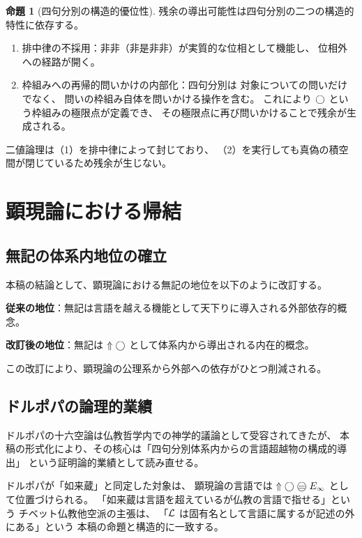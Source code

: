 \documentclass[11pt,a4paper]{article}
\theoremstyle{definition}
\newtheorem{proposition}{命題}[section]
\newcommand{\Einfty}{E_\infty}
\newcommand{\phiNS}{\text{非非}}
\begin{document}
\begin{proposition}[四句分別の構造的優位性]
残余の導出可能性は四句分別の二つの構造的特性に依存する。
\begin{enumerate}
  \item 排中律の不採用：$\phiNS$（非是非非）が実質的な位相として機能し、
        位相外への経路が開く。
  \item 枠組みへの再帰的問いかけの内部化：四句分別は
        対象についての問いだけでなく、
        問いの枠組み自体を問いかける操作を含む。
        これにより $\bigcirc$ という枠組みの極限点が定義でき、
        その極限点に再び問いかけることで残余が生成される。
\end{enumerate}
二値論理は（1）を排中律によって封じており、
（2）を実行しても真偽の積空間が閉じているため残余が生じない。
\end{proposition}

\section{顕現論における帰結}

\subsection{無記の体系内地位の確立}

本稿の結論として、顕現論における無記の地位を以下のように改訂する。

\textbf{従来の地位}：無記は言語を越える機能として天下りに導入される外部依存的概念。

\textbf{改訂後の地位}：無記は $\Uparrow\bigcirc$ として体系内から導出される内在的概念。

この改訂により、顕現論の公理系から外部への依存がひとつ削減される。

\subsection{ドルポパの論理的業績}

ドルポパの十六空論は仏教哲学内での神学的議論として受容されてきたが、
本稿の形式化により、その核心は「四句分別体系内からの言語超越物の構成的導出」
という証明論的業績として読み直せる。

ドルポパが「如来蔵」と同定した対象は、
顕現論の言語では $\metanegation\dfix \mweq \Einfty$ として位置づけられる。
「如来蔵は言語を超えているが仏教の言語で指せる」という
チベット仏教他空派の主張は、
「$\mathcal{L}$ は固有名として言語に属するが記述の外にある」という
本稿の命題と構造的に一致する。
\end{document}
